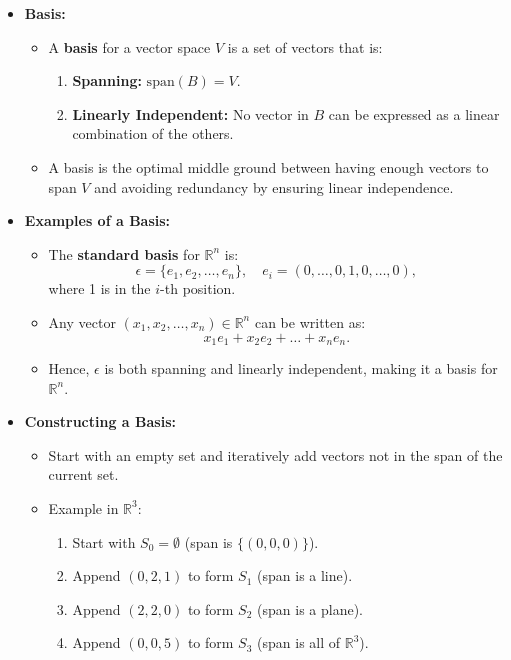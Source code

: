 \documentclass{article}
\begin{document}
\begin{itemize}
  \item \textbf{Basis:}
    \begin{itemize}
      \item A \textbf{basis} for a vector space $V$ is a set of vectors that is:
        \begin{enumerate}
          \item \textbf{Spanning:} $\text{span}(B) = V$.
          \item \textbf{Linearly Independent:} No vector in $B$ can be expressed as a linear combination of the others.
        \end{enumerate}
      \item A basis is the optimal middle ground between having enough vectors to span $V$ and avoiding redundancy by ensuring linear independence.
    \end{itemize}

  \item \textbf{Examples of a Basis:}
    \begin{itemize}
      \item The \textbf{standard basis} for $\mathbb{R}^n$ is:
        \[
          \epsilon = \{e_1, e_2, \dots, e_n\}, \quad e_i = (0, \dots, 0, 1, 0, \dots, 0),
        \]
        where 1 is in the $i$-th position.
      \item Any vector $(x_1, x_2, \dots, x_n) \in \mathbb{R}^n$ can be written as:
        \[
          x_1 e_1 + x_2 e_2 + \dots + x_n e_n.
        \]
      \item Hence, $\epsilon$ is both spanning and linearly independent, making it a basis for $\mathbb{R}^n$.
    \end{itemize}

  \item \textbf{Constructing a Basis:}
    \begin{itemize}
      \item Start with an empty set and iteratively add vectors not in the span of the current set.
      \item Example in $\mathbb{R}^3$:
        \begin{enumerate}
          \item Start with $S_0 = \emptyset$ (span is $\{(0, 0, 0)\}$).
          \item Append $(0, 2, 1)$ to form $S_1$ (span is a line).
          \item Append $(2, 2, 0)$ to form $S_2$ (span is a plane).
          \item Append $(0, 0, 5)$ to form $S_3$ (span is all of $\mathbb{R}^3$).
        \end{enumerate}
    \end{itemize}
\end{itemize}
\end{document}
